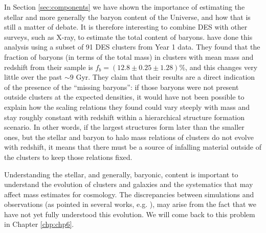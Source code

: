 In Section \ref{sec:components} we have shown the importance of estimating the stellar and more generally the baryon content of the Universe, and how that is still a matter of debate. It is therefore interesting to combine DES with other surveys, such as X-ray, to estimate the total content of baryons. \citet{chiu17} have done this analysis using a subset of 91 DES clusters from Year 1 data. They found that the fraction of baryons (in terms of the total mass) in clusters with mean mass and redshift from their sample is $f_b = (12.8\pm0.25\pm1.28)\%$, and this changes very little over the past $\sim 9$ Gyr. They claim that their results are a direct indication of the presence of the ``missing baryons'': if those baryons were not present outside clusters at the expected densities, it would have not been possible to explain how the scaling relations they found could vary steeply with mass and stay roughly constant with redshift within a hierarchical structure formation scenario. In other words, if the largest structures form later than the smaller ones, but the stellar and baryon to halo mass relations of clusters do not evolve with redshift, it means that there must be a source of infalling material outside of the clusters to keep those relations fixed.

Understanding the stellar, and generally, baryonic, content is important to understand the evolution of clusters and galaxies and the systematics that may affect mass estimates for cosmology. The discrepancies between simulations and observations (as pointed in several works, e.g. \citealt{arthur17}), may arise from the fact that we have not yet fully understood this evolution. We will come back to this problem in Chapter \ref{chp:chp6}.




